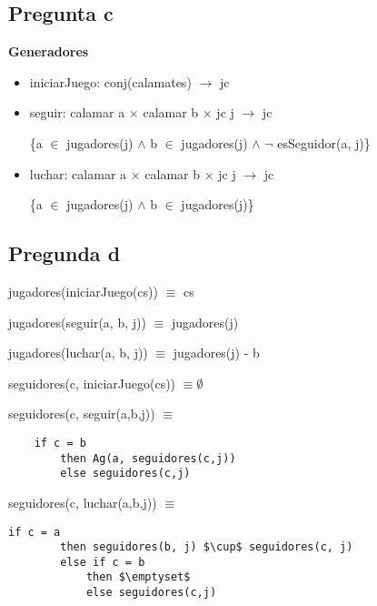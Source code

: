 \subsection*{Pregunta c}

\textbf{Generadores}
\begin{itemize}
    \item iniciarJuego: conj(calamates) $\rightarrow$ jc
    \item seguir: calamar a $\times$ calamar b $\times$ jc j $\rightarrow$ jc 
    
    \{a $\in$ jugadores(j) $\wedge$ b $\in$ jugadores(j) $\wedge$ $\neg$ esSeguidor(a, j)\}
    \item luchar: calamar a $\times$ calamar b $\times$ jc j $\rightarrow$ jc 
    
    \{a $\in$ jugadores(j) $\wedge$ b $\in$ jugadores(j)\}
\end{itemize}

\subsection*{Pregunda d}

jugadores(iniciarJuego(cs)) $\equiv$ cs

jugadores(seguir(a, b, j)) $\equiv$ jugadores(j)

jugadores(luchar(a, b, j)) $\equiv$ jugadores(j) - b

seguidores(c, iniciarJuego(cs)) $\equiv \emptyset$

seguidores(c, seguir(a,b,j)) $\equiv$

\begin{lstlisting}
    if c = b
        then Ag(a, seguidores(c,j))
        else seguidores(c,j)
\end{lstlisting}

seguidores(c, luchar(a,b,j)) $\equiv$
\begin{lstlisting}[mathescape=true]
    if c = a
        then seguidores(b, j) $\cup$ seguidores(c, j)
        else if c = b
            then $\emptyset$
            else seguidores(c,j)
\end{lstlisting}

